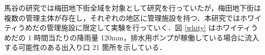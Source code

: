 \documentclass[a4paper,12pt,fleqn]{jarticle}
\begin{document}
\begin{table}[H]
  \begin{center}
    \caption{実験 2 の条件}
    \label{実験ケース2}
  \end{center}
\end{table}
\begin{table}[H]
  \begin{center}
    \caption{実験 3 の条件}
    \label{実験ケース3}
  \end{center}
\end{table}


馬谷の研究では梅田地下街全域を対象として研究を行っていたが，梅田地下街は複数の管理主体が存在し，それぞれの地区に管理施設を持つ．本研究ではホワイティうめだの管理施設に限定して実験を行っていく．図 \ref{whity} はホワイティうめだの 1 時間当たりの降雨量 120mm，排水用ポンプが稼働している場合に流入する可能性のある出入り口 21 箇所を示している．
\end{document}
